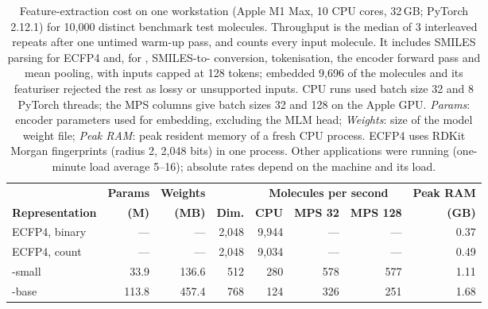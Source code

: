 \begin{table}[htbp]
  \centering
  \small
  \setlength{\tabcolsep}{3pt}
  \begin{tabular}{@{} l r r r r r r r @{}}
    \toprule
    & \textbf{Params} & \textbf{Weights} & & \multicolumn{3}{c}{\textbf{Molecules per second}} & \textbf{Peak RAM} \\
    \cmidrule(lr){5-7}
    \textbf{Representation} & \textbf{(M)} & \textbf{(MB)} & \textbf{Dim.} & \textbf{CPU} & \textbf{MPS 32} & \textbf{MPS 128} & \textbf{(GB)} \\
    \midrule
    ECFP4, binary & --- & --- & 2,048 & 9,944 & --- & --- & 0.37 \\
    ECFP4, count & --- & --- & 2,048 & 9,034 & --- & --- & 0.49 \\
    \model{}-small & 33.9 & 136.6 & 512 & 280 & 578 & 577 & 1.11 \\
    \model{}-base & 113.8 & 457.4 & 768 & 124 & 326 & 251 & 1.68 \\
    \bottomrule
  \end{tabular}
  \caption{Feature-extraction cost on one workstation (Apple M1 Max, 10 CPU cores, 32\,GB; PyTorch 2.12.1) for 10,000 distinct benchmark test molecules. Throughput is the median of 3 interleaved repeats after one untimed warm-up pass, and counts every input molecule. It includes SMILES parsing for ECFP4 and, for \model{}, SMILES-to-\selfies{} conversion, tokenisation, the encoder forward pass and mean pooling, with inputs capped at 128 tokens; \model{} embedded 9,696 of the molecules and its featuriser rejected the rest as lossy or unsupported inputs. CPU runs used batch size 32 and 8 PyTorch threads; the MPS columns give batch sizes 32 and 128 on the Apple GPU. \emph{Params}: encoder parameters used for embedding, excluding the MLM head; \emph{Weights}: size of the model weight file; \emph{Peak RAM}: peak resident memory of a fresh CPU process. ECFP4 uses RDKit Morgan fingerprints (radius 2, 2,048 bits) in one process. Other applications were running (one-minute load average 5--16); absolute rates depend on the machine and its load.}
  \label{tab:extraction-cost}
\end{table}
